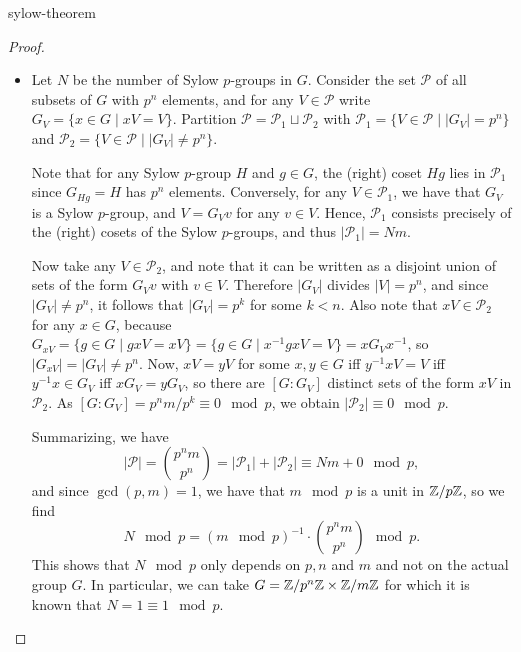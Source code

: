 \begin{example}{sylow-theorem}
    \begin{proof}
    \begin{itemize}
        \item Let $N$ be the number of Sylow $p$-groups in $G$. Consider the set $\mathcal{P}$ of all subsets of $G$ with $p^n$ elements, and for any $V \in \mathcal{P}$ write $G_V = \{ x \in G \mid xV = V \}$. Partition $\mathcal{P} = \mathcal{P}_1 \sqcup \mathcal{P}_2$ with $\mathcal{P}_1 = \{ V \in \mathcal{P} \mid |G_V| = p^n \}$ and $\mathcal{P}_2 = \{ V \in \mathcal{P} \mid |G_V| \ne p^n \}$.
    
        Note that for any Sylow $p$-group $H$ and $g \in G$, the (right) coset $Hg$ lies in $\mathcal{P}_1$ since $G_{Hg} = H$ has $p^n$ elements. Conversely, for any $V \in \mathcal{P}_1$, we have that $G_V$ is a Sylow $p$-group, and $V = G_V v$ for any $v \in V$. Hence, $\mathcal{P}_1$ consists precisely of the (right) cosets of the Sylow $p$-groups, and thus $|\mathcal{P}_1| = N m$.
    
        Now take any $V \in \mathcal{P}_2$, and note that it can be written as a disjoint union of sets of the form $G_V v$ with $v \in V$. Therefore $|G_V|$ divides $|V| = p^n$, and since $|G_V| \ne p^n$, it follows that $|G_V| = p^k$ for some $k < n$. Also note that $xV \in \mathcal{P}_2$ for any $x \in G$, because $G_{xV} = \{ g \in G \mid gxV = xV \} = \{ g \in G \mid x^{-1} g x V = V \} = x G_V x^{-1}$, so $|G_{xV}| = |G_V| \ne p^n$. Now, $xV = yV$ for some $x, y \in G$ iff $y^{-1} x V = V$ iff $y^{-1} x \in G_V$ iff $x G_V = y G_V$, so there are $[G : G_V]$ distinct sets of the form $xV$ in $\mathcal{P}_2$. As $[G : G_V] = p^n m / p^k \equiv 0 \mod p$, we obtain $|\mathcal{P}_2| \equiv 0 \mod p$.
    
        Summarizing, we have
        \[ |\mathcal{P}| = \binom{p^n m}{p^n} = |\mathcal{P}_1| + |\mathcal{P}_2| \equiv Nm + 0 \mod p , \]
        and since $\gcd(p, m) = 1$, we have that $m \mod p$ is a unit in $\mathbb{Z}/p\mathbb{Z}$, so we find
        \[ N \mod p = (m \mod p)^{-1} \cdot \binom{p^n m}{p^n} \mod p . \]
        This shows that $N \mod p$ only depends on $p, n$ and $m$ and not on the actual group $G$. In particular, we can take $G = \mathbb{Z}/p^n \mathbb{Z} \times \mathbb{Z}/m\mathbb{Z}$ for which it is known that $N = 1 \equiv 1 \mod p$.
    

\end{itemize}
\end{proof}
\end{example}
